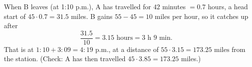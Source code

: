 When B leaves (at 1:10 p.m.), A has travelled for $42$ minutes $=0.7$ hours, a head start of $45\cdot0.7=31.5$ miles. B gains $55-45=10$ miles per hour, so it catches up after
\[
\dfrac{31.5}{10}=3.15\text{ hours}=3\text{ h }9\text{ min}.
\]
That is at $1{:}10+3{:}09=\boxed{4{:}19\text{ p.m.}}$, at a distance of $55\cdot3.15=\boxed{173.25\text{ miles}}$ from the station. (Check: A has then travelled $45\cdot3.85=173.25$ miles.)
